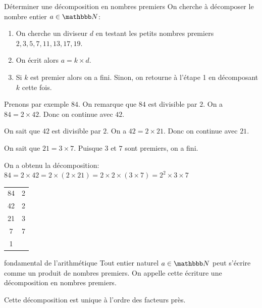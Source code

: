 \documentclass[10pt,a4paper,openany,twoside,prof]{book}
\begin{document}
\begin{methode}{Déterminer une décomposition en nombres premiers}{}
	On cherche à décomposer le nombre entier $a\in\N$:
	\begin{enumerate}
		\item On cherche un diviseur $d$ en testant les petits nombres premiers $2,3,5,7,11,13,17,19$.
		\item On écrit alors $a=k\times d$.
		\item Si $k$ est premier alors on a fini. Sinon, on retourne à l'étape 1 en décomposant $k$ cette fois.
	\end{enumerate}
\end{methode}

\begin{ex}{}{}

	\begin{minipage}{.7\linewidth}
		Prenons par exemple $84$. On remarque que $84$ est divisible par $2$. On a $84 = 2\times42$. Donc on continue avec $42$.
	
		On sait que $42$ est divisible par $2$. On a $42=2\times21$. Donc on continue avec $21$.
	
		On sait que $21=3\times7$. Puisque $3$ et $7$ sont premiers, on a fini.
	
		On a obtenu la décomposition:
		$84 = 2\times42 = 2\times(2\times21)=2\times2\times(3\times7) = 2^2\times3\times7$
	\end{minipage}
	\begin{minipage}{.3\linewidth}
		\hspace{1cm}
		\begin{tabular}{c|c}
			84 & 2\\
			42 & 2 \\
			21 & 3 \\
			7 & 7 \\
			1&
		\end{tabular}
	\end{minipage}
\end{ex}

\begin{theo}{fondamental de l'arithmétique}{}
	Tout entier naturel $a\in\N$ peut s'écrire comme un produit de nombres premiers. On appelle cette écriture une décomposition en nombres premiers.

	Cette décomposition est unique à l'ordre des facteurs près.


	
\end{theo}
\end{document}
